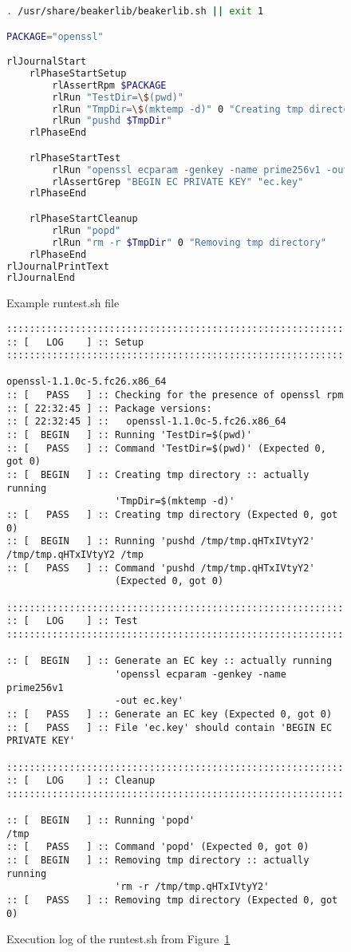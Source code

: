     \begin{figure}
        \begin{lstlisting}[language=Bash,basicstyle=\small]
. /usr/share/beakerlib/beakerlib.sh || exit 1

PACKAGE="openssl"

rlJournalStart
    rlPhaseStartSetup
        rlAssertRpm $PACKAGE
        rlRun "TestDir=\$(pwd)"
        rlRun "TmpDir=\$(mktemp -d)" 0 "Creating tmp directory"
        rlRun "pushd $TmpDir"
    rlPhaseEnd

    rlPhaseStartTest
        rlRun "openssl ecparam -genkey -name prime256v1 -out ec.key"
        rlAssertGrep "BEGIN EC PRIVATE KEY" "ec.key"
    rlPhaseEnd

    rlPhaseStartCleanup
        rlRun "popd"
        rlRun "rm -r $TmpDir" 0 "Removing tmp directory"
    rlPhaseEnd
rlJournalPrintText
rlJournalEnd
        \end{lstlisting}
        \caption{Example runtest.sh file} \label{fig:runtest.sh}
    \end{figure}

    \begin{figure}
        \begin{lstlisting}[basicstyle=\small]
:::::::::::::::::::::::::::::::::::::::::::::::::::::::::::::::
:: [   LOG    ] :: Setup
:::::::::::::::::::::::::::::::::::::::::::::::::::::::::::::::

openssl-1.1.0c-5.fc26.x86_64
:: [   PASS   ] :: Checking for the presence of openssl rpm
:: [ 22:32:45 ] :: Package versions:
:: [ 22:32:45 ] ::   openssl-1.1.0c-5.fc26.x86_64
:: [  BEGIN   ] :: Running 'TestDir=$(pwd)'
:: [   PASS   ] :: Command 'TestDir=$(pwd)' (Expected 0, got 0)
:: [  BEGIN   ] :: Creating tmp directory :: actually running
                   'TmpDir=$(mktemp -d)'
:: [   PASS   ] :: Creating tmp directory (Expected 0, got 0)
:: [  BEGIN   ] :: Running 'pushd /tmp/tmp.qHTxIVtyY2'
/tmp/tmp.qHTxIVtyY2 /tmp
:: [   PASS   ] :: Command 'pushd /tmp/tmp.qHTxIVtyY2'
                   (Expected 0, got 0)

:::::::::::::::::::::::::::::::::::::::::::::::::::::::::::::::
:: [   LOG    ] :: Test
:::::::::::::::::::::::::::::::::::::::::::::::::::::::::::::::

:: [  BEGIN   ] :: Generate an EC key :: actually running
                   'openssl ecparam -genkey -name prime256v1
                   -out ec.key'
:: [   PASS   ] :: Generate an EC key (Expected 0, got 0)
:: [   PASS   ] :: File 'ec.key' should contain 'BEGIN EC PRIVATE KEY'

:::::::::::::::::::::::::::::::::::::::::::::::::::::::::::::::
:: [   LOG    ] :: Cleanup
:::::::::::::::::::::::::::::::::::::::::::::::::::::::::::::::

:: [  BEGIN   ] :: Running 'popd'
/tmp
:: [   PASS   ] :: Command 'popd' (Expected 0, got 0)
:: [  BEGIN   ] :: Removing tmp directory :: actually running
                   'rm -r /tmp/tmp.qHTxIVtyY2'
:: [   PASS   ] :: Removing tmp directory (Expected 0, got 0)
        \end{lstlisting}
        \caption{Execution log of the runtest.sh from Figure~\ref{fig:runtest.sh}}
        \label{fig:runtest.sh-log}
    \end{figure}

